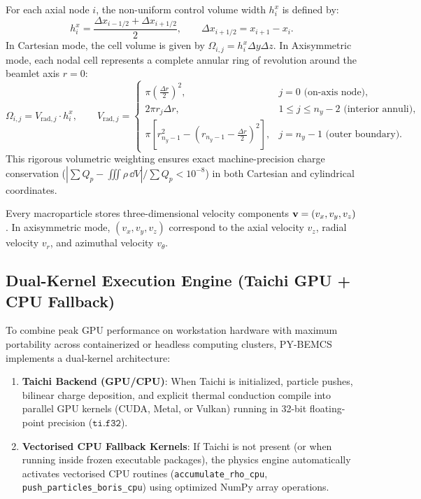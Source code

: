 \documentclass[11pt,a4paper]{article}
\newcommand{\PYBEMCS}{PY-BEMCS}
\begin{document}
For each axial node $i$, the non-uniform control volume width $h_i^x$ is defined by:
\begin{equation}
    h_i^x = \frac{\Delta x_{i-1/2} + \Delta x_{i+1/2}}{2}, \qquad \Delta x_{i+1/2} = x_{i+1} - x_i.
\end{equation}
In Cartesian mode, the cell volume is given by $\Omega_{i,j} = h_i^x \Delta y \Delta z$. In Axisymmetric mode, each nodal cell represents a complete annular ring of revolution around the beamlet axis $r = 0$:
\begin{equation}
    \Omega_{i,j} = V_{\mathrm{rad}, j} \cdot h_i^x, \qquad
    V_{\mathrm{rad}, j} = 
    \begin{cases}
        \pi \left(\frac{\Delta r}{2}\right)^2, & j = 0 \text{ (on-axis node)}, \\
        2\pi r_j \Delta r, & 1 \le j \le n_y - 2 \text{ (interior annuli)}, \\
        \pi \left[r_{n_y-1}^2 - \left(r_{n_y-1} - \frac{\Delta r}{2}\right)^2\right], & j = n_y - 1 \text{ (outer boundary)}.
    \end{cases}
\end{equation}
This rigorous volumetric weighting ensures exact machine-precision charge conservation ($|\sum Q_p - \iiint \rho\, \dd{V}| / \sum Q_p < 10^{-8}$) in both Cartesian and cylindrical coordinates.

Every macroparticle stores three-dimensional velocity components $\vb{v} = (v_x, v_y, v_z)$. In axisymmetric mode, $(v_x, v_y, v_z)$ correspond to the axial velocity $v_z$, radial velocity $v_r$, and azimuthal velocity $v_\theta$.

\subsection{Dual-Kernel Execution Engine (Taichi GPU + CPU Fallback)}

To combine peak GPU performance on workstation hardware with maximum portability across containerized or headless computing clusters, \PYBEMCS{} implements a dual-kernel architecture:
\begin{enumerate}[nosep]
    \item \textbf{Taichi Backend (GPU/CPU)}: When Taichi is initialized, particle pushes, bilinear charge deposition, and explicit thermal conduction compile into parallel GPU kernels (CUDA, Metal, or Vulkan) running in 32-bit floating-point precision ($\texttt{ti.f32}$).
    \item \textbf{Vectorised CPU Fallback Kernels}: If Taichi is not present (or when running inside frozen executable packages), the physics engine automatically activates vectorised CPU routines (\texttt{accumulate\_rho\_cpu}, \texttt{push\_particles\_boris\_cpu}) using optimized NumPy array operations.
\end{enumerate}
\end{document}
